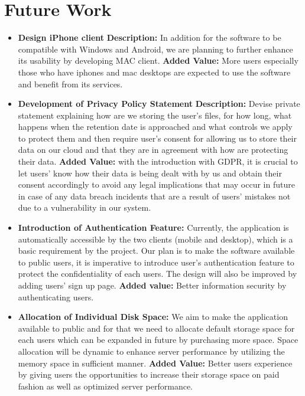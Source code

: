 \documentclass{article}
\begin{document}
\section{Future Work}
\begin{itemize}

\item \textbf{Design iPhone client}
\textbf{Description:} In addition for the software to be compatible with Windows and Android, we are planning to further enhance its usability by developing MAC client.
\textbf{Added Value:} More users especially those who have iphones and mac desktops are expected to use the software and benefit from its services.

\item \textbf{Development of Privacy Policy Statement}
\textbf{Description:} Devise private statement explaining how are we storing the user’s files, for how long, what happens when the retention date is approached and what controls we apply to protect them and then require user’s consent for allowing us to store their data on our cloud and that they are in agreement with how are protecting their data.
\textbf{Added Value:} with the introduction with GDPR, it is crucial to let users’ know how their data is being dealt with by us and obtain their consent accordingly to avoid any legal implications that may occur in future in case of any data breach incidents that are a result of users’ mistakes not due to a vulnerability in our system.


\item \textbf{Introduction of Authentication Feature:} Currently, the application is automatically accessible by the two clients (mobile and desktop), which is a basic requirement by the project. Our plan is to make the software available to public users, it is imperative to introduce user’s authentication feature to protect the confidentiality of each users. The design will also be improved by adding users’ sign up page.
\textbf{Added value:} Better information security by authenticating users.

\item \textbf{Allocation of Individual Disk Space:} We aim to make the application available to public and for that we need to allocate default storage space for each users which can be expanded in future by purchasing more space. Space allocation will be dynamic to enhance server performance by utilizing the memory space in sufficient manner.
\textbf{Added Value:} Better users experience by giving users the opportunities to increase their storage space on paid fashion as well as optimized server performance.



\end{itemize}
\end{document}
